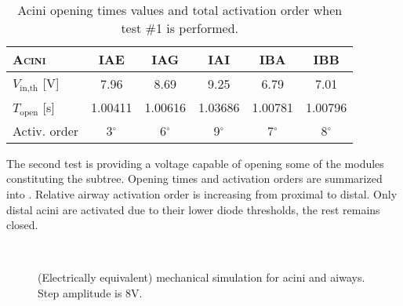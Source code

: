 \begin{table}[H]\centering
  {\renewcommand{\arraystretch}{1.2}
    \begin{tabularx}{\textwidth}{|P{6em}|C|C|C|C|C|}
      \hline
      \textsc{Acini}
      & IAE
      & IAG
      & IAI
      & IBA
      & IBB\\
      \hline
      $V_{\text{in,th}}$ [V]
      & 7.96
      & 8.69
      & 9.25
      & 6.79
      & 7.01\\
      \hline
      $T_{\text{open}}$ [s]
      & 1.00411
      & 1.00616
      & 1.03686
      & 1.00781
      & 1.00796\\
      \hline
      Activ. order
      & 3$^{\circ}$
      & 6$^{\circ}$
      & 9$^{\circ}$
      & 7$^{\circ}$
      & 8$^{\circ}$\\
      \hline
    \end{tabularx}
  }
  \caption{Acini opening times values and total activation order
    when test \#1 is performed.}
  \label{tab:acini_test1}
\end{table}

The second test is providing a voltage capable of opening some of the
modules constituting the subtree.  Opening times and activation orders
are summarized into .
Relative airway activation order is increasing from proximal to
distal.  Only distal acini are activated due to their lower diode
thresholds, the rest remains closed.

\begin{figure}[H]\centering
  \hspace{1cm}
  \\
  \hspace{1cm}
  \caption{(Electrically equivalent) mechanical simulation for acini
    and aiways.  Step amplitude is 8V.}
  \label{fig:mechanical_results_8}
\end{figure}


